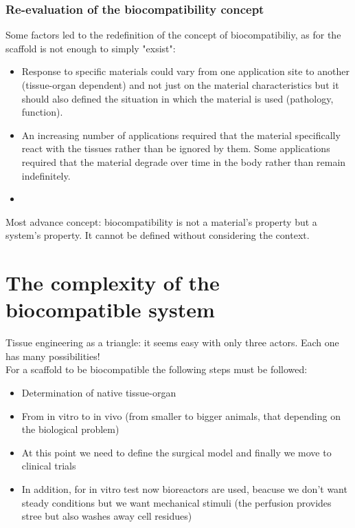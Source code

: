 \subsubsection{Re-evaluation of the biocompatibility concept}
Some factors led to the redefinition of the concept of biocompatibiliy, as for the scaffold is not enough to simply "exsist":
\begin{itemize}
\item Response to specific materials could vary from one application site to another (tissue-organ dependent) and not just on the material characteristics but it should also defined the situation in which the material is used (pathology, function).
\item An increasing number of applications required that the material specifically react with the tissues rather than be ignored by them. Some applications required that the material degrade over time in the body rather than remain indefinitely.
\item 
\end{itemize}
Most advance concept: biocompatibility is not a material's property but a system's property. It cannot be defined without considering the context.

\section{The complexity of the biocompatible system}
Tissue engineering as a triangle: it seems easy with only three actors. Each one has many possibilities! 
\\
For a scaffold to be biocompatible the following steps must be followed:
\begin{itemize}
\item Determination of native tissue-organ
\item From in vitro to in vivo (from smaller to bigger animals, that depending on the biological problem)
\item At this point we need to define the surgical model and finally we move to clinical trials
\item In addition, for in vitro test now bioreactors are used, beacuse we don't want steady conditions but we want mechanical stimuli (the perfusion provides stree but also washes away cell residues)
\end{itemize}

